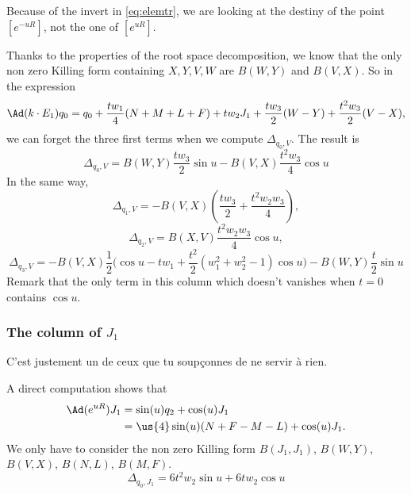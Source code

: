 \begin{remark}
	Because of the invert in \eqref{eq:elemtr}, we are looking at the destiny of the point $[e^{-uR}]$, not the one of $[e^{uR}]$.
\end{remark}

Thanks to the properties of the root space decomposition, we know that the only non zero Killing form containing $X,Y,V,W$ are $B(W,Y)$ and $B(V,X)$. So in the expression
\[
	\Ad(k\cdot E_1)q_0=q_0+\frac{tw_1}{4}(N+M+L+F)+tw_2J_1+\frac{tw_3}{2}(W-Y)+\frac{t^2w_3}{2}(V-X),
\]
we can forget the three first terms when we compute $\Delta_{q_0,V}$. The result is
\begin{equation}
	\boxed{\Delta_{q_0,V}=B(W,Y)\frac{tw_3}{2}\sin u-B(V,X)\frac{t^2w_3}{4}\cos u}
\end{equation}
In the same way,
\begin{equation}
	\boxed{\Delta_{q_1,V}=-B(V,X)\left( \frac{tw_3}{2}+\frac{t^2w_2w_3}{4} \right)},
\end{equation}
\begin{equation}
	\boxed{ \Delta_{q_2,V}=B(X,V)\frac{t^2w_2w_3}{4}\cos u },
\end{equation}
\begin{equation}
	\boxed{\Delta_{q_3,V}=-B(V,X)\frac{1}{2}\big(  \cos u-tw_1+\frac{t^2}{2}(w_1^2+w_2^2-1)\cos u  \big)-B(W,Y)\frac{t}{2}\sin u}
\end{equation}
Remark that the only term in this column which doesn't vanishes when $t=0$ contains $\cos u$.

\subsubsection{The column of \texorpdfstring{$J_1$}{J1}}

\begin{probleme}
	C'est justement un de ceux que tu soup\c connes de ne servir \`a rien.
\end{probleme}

A direct computation shows that
\begin{equation}
	\begin{split}
		\Ad(e^{uR})J_1 & =\sin(u) q_2+\cos(u) J_1             \\
		               & =\us{4}\sin(u)(N+F-M-L)+\cos(u) J_1.
	\end{split}
\end{equation}
We only have to consider the non zero Killing form $B(J_1,J_1)$, $B(W,Y)$, $B(V,X)$, $B(N,L)$, $B(M,F)$.
\begin{equation}
	\boxed{\Delta_{q_0,J_1}=6t^2w_2\sin u+6tw_2\cos u}
\end{equation}

